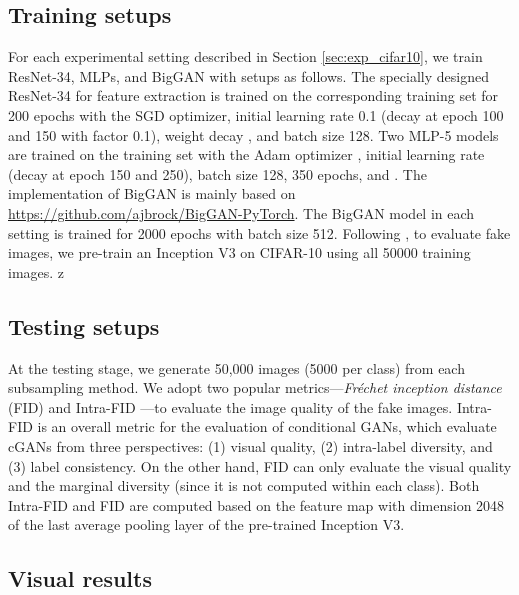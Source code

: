 \documentclass[10pt, twocolumn]{article}
\theoremstyle{definition}
\begin{document}
\subsection{Training setups} \label{supp:train_setup_of_cifar10_exp}

For each experimental setting described in Section \ref{sec:exp_cifar10}, we train ResNet-34, MLPs, and BigGAN with setups as follows. The specially designed ResNet-34 for feature extraction is trained on the corresponding training set for 200 epochs with the SGD optimizer, initial learning rate 0.1 (decay at epoch 100 and 150 with factor 0.1), weight decay , and batch size 128. Two MLP-5 models are trained on the training set with the Adam optimizer \cite{kingma2014adam}, initial learning rate  (decay at epoch 150 and 250), batch size 128, 350 epochs, and . The implementation of BigGAN is mainly based on \url{https://github.com/ajbrock/BigGAN-PyTorch}. The BigGAN model in each setting is trained for 2000 epochs with batch size 512. Following \cite{ding2020subsampling}, to evaluate fake images, we pre-train an Inception V3 on CIFAR-10 using all 50000 training images.
z

\subsection{Testing setups} \label{supp:test_setup_of_cifar10_exp}

At the testing stage, we generate 50,000 images (5000 per class) from each subsampling method. We adopt two popular metrics---\textit{Fr\'echet inception distance} (FID) \cite{heusel2017gans} and Intra-FID \cite{miyato2018cgans}---to evaluate the image quality of the fake images. Intra-FID is an overall metric for the evaluation of conditional GANs, which evaluate cGANs from three perspectives: (1) visual quality, (2) intra-label diversity, and (3) label consistency. On the other hand, FID can only evaluate the visual quality and the marginal diversity (since it is not computed within each class). Both Intra-FID and FID are computed based on the feature map with dimension 2048 of the last average pooling layer of the pre-trained Inception V3. 



\subsection{Visual results} \label{supp:details_of_cifar10_visual_results}
\end{document}

